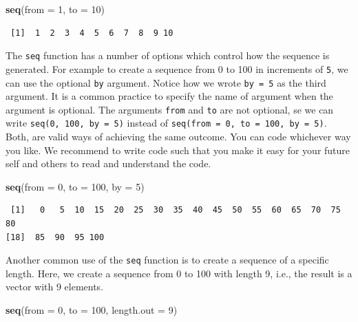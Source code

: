 \documentclass[]{article}
\newenvironment{Shaded}{\begin{snugshade}}{\end{snugshade}}
\newcommand{\KeywordTok}[1]{\textcolor[rgb]{0.13,0.29,0.53}{\textbf{#1}}}
\newcommand{\DataTypeTok}[1]{\textcolor[rgb]{0.13,0.29,0.53}{#1}}
\newcommand{\DecValTok}[1]{\textcolor[rgb]{0.00,0.00,0.81}{#1}}
\newcommand{\NormalTok}[1]{#1}
\theoremstyle{definition}
\theoremstyle{definition}
\theoremstyle{definition}
\theoremstyle{remark}
\begin{document}
\begin{Shaded}
\begin{Highlighting}[]
\KeywordTok{seq}\NormalTok{(}\DataTypeTok{from =} \DecValTok{1}\NormalTok{, }\DataTypeTok{to =} \DecValTok{10}\NormalTok{)}
\end{Highlighting}
\end{Shaded}

\begin{verbatim}
 [1]  1  2  3  4  5  6  7  8  9 10
\end{verbatim}

The \texttt{seq} function has a number of options which control how the
sequence is generated. For example to create a sequence from 0 to 100 in
increments of \texttt{5}, we can use the optional \texttt{by} argument.
Notice how we wrote \texttt{by\ =\ 5} as the third argument. It is a
common practice to specify the name of argument when the argument is
optional. The arguments \texttt{from} and \texttt{to} are not optional,
se we can write \texttt{seq(0,\ 100,\ by\ =\ 5)} instead of
\texttt{seq(from\ =\ 0,\ to\ =\ 100,\ by\ =\ 5)}. Both, are valid ways
of achieving the same outcome. You can code whichever way you like. We
recommend to write code such that you make it easy for your future self
and others to read and understand the code.

\begin{Shaded}
\begin{Highlighting}[]
\KeywordTok{seq}\NormalTok{(}\DataTypeTok{from =} \DecValTok{0}\NormalTok{, }\DataTypeTok{to =} \DecValTok{100}\NormalTok{, }\DataTypeTok{by =} \DecValTok{5}\NormalTok{)}
\end{Highlighting}
\end{Shaded}

\begin{verbatim}
 [1]   0   5  10  15  20  25  30  35  40  45  50  55  60  65  70  75  80
[18]  85  90  95 100
\end{verbatim}

Another common use of the \texttt{seq} function is to create a sequence
of a specific length. Here, we create a sequence from 0 to 100 with
length 9, i.e., the result is a vector with 9 elements.

\begin{Shaded}
\begin{Highlighting}[]
\KeywordTok{seq}\NormalTok{(}\DataTypeTok{from =} \DecValTok{0}\NormalTok{, }\DataTypeTok{to =} \DecValTok{100}\NormalTok{, }\DataTypeTok{length.out =}  \DecValTok{9}\NormalTok{)}
\end{Highlighting}
\end{Shaded}
\end{document}
